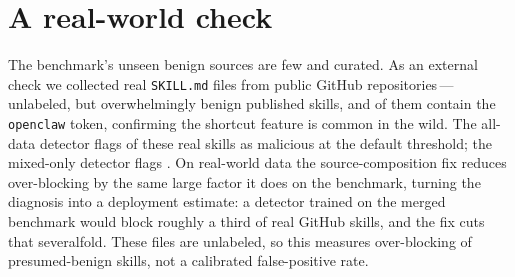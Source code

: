 \section{A real-world check}
\label{sec:wild}
The benchmark's unseen benign sources are few and curated. As an external check we collected \WildN{}
real \texttt{SKILL.md} files from public GitHub repositories\,---\,unlabeled, but overwhelmingly benign
published skills, and \WildOpenclaw{} of them contain the \texttt{openclaw} token, confirming the
shortcut feature is common in the wild. The all-data detector flags \WildFlaggedAll{} of these real
skills as malicious at the default threshold; the mixed-only detector flags \WildFlaggedMixed{}. On
real-world data the source-composition fix reduces over-blocking by the same large factor it does on the
benchmark, turning the diagnosis into a deployment estimate: a detector trained on the merged benchmark
would block roughly a third of real GitHub skills, and the fix cuts that severalfold. These files are
unlabeled, so this measures over-blocking of presumed-benign skills, not a calibrated false-positive
rate.
